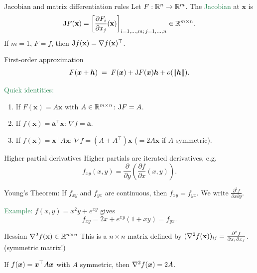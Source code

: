 \documentclass{beamer}
\begin{document}
\begin{frame}{Jacobian and matrix differentiation rules}
Let \(F:\mathbb R^n\to\mathbb R^m\). The \textcolor{SeaGreen}{Jacobian} at \(\mathbf{x}\) is
\[
{\rm J}F(\mathbf{x})
=\left[\frac{\partial F_i}{\partial x_j}(\mathbf{x})\right]_{i=1,\dots,m;\,j=1,\dots,n}\in\mathbb R^{m\times n}.
\]
If \(m=1\), \(F=f\), then \({\rm J}f(\mathbf{x})=\nabla f(\mathbf{x})^\top\).

\medskip
\begin{block}{First-order approximation}
	$$F(\boldsymbol x+\boldsymbol h)\;=\;F(\boldsymbol x)+{\rm J}F(\boldsymbol x)\boldsymbol h +o(\|\boldsymbol h\|).$$
\end{block}


\medskip
\textcolor{SeaGreen}{Quick identities:}
\begin{enumerate}
\item If \(F(\mathbf{x})=A\mathbf{x}\) with \(A\in\mathbb R^{m\times n}\): \({\rm J}F=A\).
\item If \(f(\mathbf{x})=\mathbf{a}^{\top}\mathbf{x}\): \(\nabla f=\mathbf{a}\).
\item If \(f(\mathbf{x})=\mathbf{x}^{\top}A\mathbf{x}\): \(\nabla f=(A+A^{\top})\mathbf{x}\) (\(=2A\mathbf{x}\) if \(A\) symmetric).
\end{enumerate}
\end{frame}


\begin{frame}{Higher partial derivatives}
Higher partials are iterated derivatives, e.g.
\[
f_{xy}(x,y)=\frac{\partial}{\partial y}\!\left(\frac{\partial f}{\partial x}(x,y)\right).
\]
\begin{alertblock}{Young's Theorem:}
If \(f_{xy}\) and \(f_{yx}\) are continuous, then \(f_{xy}=f_{yx}\).	We write $\frac{\partial^2 f}{\partial x\partial y}$.
\end{alertblock}
\bigskip

\textcolor{SeaGreen}{Example:} \(f(x,y)=x^2y+e^{xy}\) gives
\[
f_{xy}=2x+e^{xy}(1+xy)=f_{yx}.
\]
\begin{block}{Hessian $\nabla^2 f(\mathbf{x})\in \mathbb R^{n\times n}$}
This is a $n\times n$ matrix defined by $(\nabla^2 f(\mathbf{x}))_{ij}=\frac{\partial^2 f }{\partial x_i \partial x_j}$. (symmetric matrix!)
\end{block}
\qquad If $f(\boldsymbol x)=\boldsymbol x^\top A\boldsymbol x$ with $A$ symmetric, then $\nabla^2f(\boldsymbol x)=2A$.
\end{frame}
\end{document}
